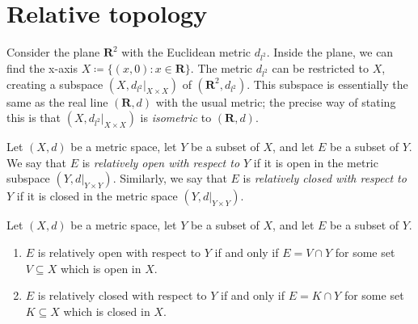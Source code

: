 \section{Relative topology}\label{sec 1.3}

\begin{note}
    Consider the plane \(\mathbf{R}^2\) with the Euclidean metric \(d_{l^2}\).
    Inside the plane, we can find the x-axis \(X \coloneqq \{(x, 0) : x \in \mathbf{R}\}\).
    The metric \(d_{l^2}\) can be restricted to \(X\), creating a subspace \((X, d_{l^2}|_{X \times X})\) of \((\mathbf{R}^2, d_{l^2})\).
    This subspace is essentially the same as the real line \((\mathbf{R}, d)\) with the usual metric;
    the precise way of stating this is that \((X, d_{l^2}|_{X \times X})\) is \emph{isometric} to \((\mathbf{R}, d)\).
\end{note}

\setcounter{theorem}{2}
\begin{definition}\label{1.3.3}
    Let \((X, d)\) be a metric space, let \(Y\) be a subset of \(X\), and let \(E\) be a subset of \(Y\).
    We say that \(E\) is \emph{relatively open with respect to \(Y\)} if it is open in the metric subspace \((Y, d|_{Y \times Y})\).
    Similarly, we say that \(E\) is \emph{relatively closed with respect to \(Y\)} if it is closed in the metric space \((Y, d|_{Y \times Y})\).
\end{definition}

\begin{proposition}\label{1.3.4}
    Let \((X, d)\) be a metric space, let \(Y\) be a subset of \(X\), and let \(E\) be a subset of \(Y\).
    \begin{enumerate}
        \item \(E\) is relatively open with respect to \(Y\) if and only if \(E = V \cap Y\) for some set \(V \subseteq X\) which is open in \(X\).
        \item \(E\) is relatively closed with respect to \(Y\) if and only if \(E = K \cap Y\) for some set \(K \subseteq X\) which is closed in \(X\).
    \end{enumerate}
\end{proposition}

